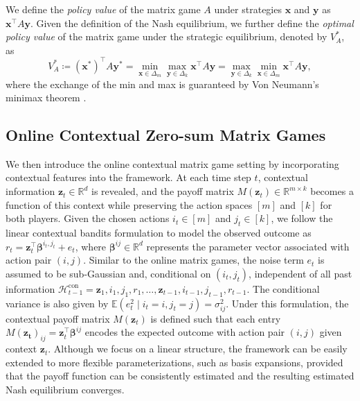 \documentclass[12pt]{article}
\begin{document}
We define the \textit{policy value} of the matrix game $A$ under strategies $\bm{x}$ and $\bm{y}$ as $\bm{x}^\top A \bm{y}$.
Given the definition of the Nash equilibrium, we further define the \textit{optimal policy value} of the matrix game under the strategic equilibrium, denoted by $V_A^\ast$, as
\begin{equation}
    \label{equ:bandit_value}
    V_A^\ast \coloneqq (\bm{x}^\ast)^\top A \bm{y}^\ast = \min_{\bm{x} \in \Delta_m} \max_{\bm{y} \in \Delta_k} \bm{x}^\top A \bm{y} =  \max_{\bm{y} \in \Delta_k} \min_{\bm{x} \in \Delta_m} \bm{x}^\top A \bm{y},
\end{equation}
where the exchange of the min and max is guaranteed by Von Neumann’s minimax theorem \citep{v1928theorie}. 

\subsection{Online Contextual Zero-sum Matrix Games} 
\label{subsec:context}
We then introduce the online contextual matrix game setting by incorporating contextual features into the framework. At each time step $t$, contextual information $\bm{z}_t \in \mathbb{R}^d$ is revealed, and the payoff matrix $M(\bm{z}_t) \in \mathbb{R}^{m\times k}$ becomes a function of this context while preserving the action spaces $[m]$ and $[k]$ for both players. 
Given the chosen actions $i_t \in [m]$ and $j_t \in [k]$, we follow the linear contextual bandits formulation \citep{chen2021statistical,shen2024doubly} to model the observed outcome as 
$r_t = \bm{z}_t^{\top}\bm{\beta}^{i_t,j_t}+e_t$, 
where $\bm{\beta}^{ij} \in \mathbb{R}^d$ represents the parameter vector associated with action pair $(i,j)$. Similar to the online matrix games, the noise term $e_t$ is assumed to be sub-Gaussian and, conditional on $(i_t, j_t)$, independent of all past information $\mathcal{H}_{t-1}^{\mathrm{con}} = {\bm{z}_1, i_1, j_1, r_1, \ldots, \bm{z}_{t-1}, i_{t-1}, j_{t-1}, r_{t-1}}$. The conditional variance is also given by $\mathbb{E}(e_t^2 \mid i_t = i, j_t = j) = \sigma_{ij}^2$. Under this formulation, the contextual payoff matrix $M(\bm{z}_t)$ is defined such that each entry $M(\bm{z_t})_{ij} = \bm{z}_t^{\top}\bm{\beta}^{ij}$ encodes the expected outcome with action pair $(i,j)$ given context $\bm{z}_t$. 
Although we focus on a linear structure, the framework can be easily extended to more flexible parameterizations, such as basis expansions, provided that the payoff function can be consistently estimated and the resulting estimated Nash equilibrium converges.
\end{document}
